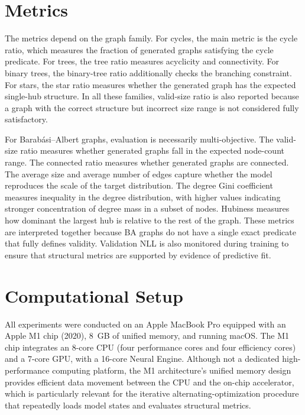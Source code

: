 \section{Metrics}
\label{sec:protocol-metrics}

The metrics depend on the graph family. For cycles, the main metric is the cycle ratio, which measures the fraction of generated graphs satisfying the cycle predicate. For trees, the tree ratio measures acyclicity and connectivity. For binary trees, the binary-tree ratio additionally checks the branching constraint. For stars, the star ratio measures whether the generated graph has the expected single-hub structure. In all these families, valid-size ratio is also reported because a graph with the correct structure but incorrect size range is not considered fully satisfactory.

For Barab\'asi--Albert graphs, evaluation is necessarily multi-objective. The valid-size ratio measures whether generated graphs fall in the expected node-count range. The connected ratio measures whether generated graphs are connected. The average size and average number of edges capture whether the model reproduces the scale of the target distribution. The degree Gini coefficient measures inequality in the degree distribution, with higher values indicating stronger concentration of degree mass in a subset of nodes. Hubiness measures how dominant the largest hub is relative to the rest of the graph. These metrics are interpreted together because BA graphs do not have a single exact predicate that fully defines validity. Validation NLL is also monitored during training to ensure that structural metrics are supported by evidence of predictive fit.

\section{Computational Setup}
\label{sec:protocol-computational-setup}

All experiments were conducted on an Apple MacBook Pro equipped with an Apple M1 chip (2020), 8~GB of unified memory, and running macOS. The M1 chip integrates an 8-core CPU (four performance cores and four efficiency cores) and a 7-core GPU, with a 16-core Neural Engine. Although not a dedicated high-performance computing platform, the M1 architecture's unified memory design provides efficient data movement between the CPU and the on-chip accelerator, which is particularly relevant for the iterative alternating-optimization procedure that repeatedly loads model states and evaluates structural metrics.

